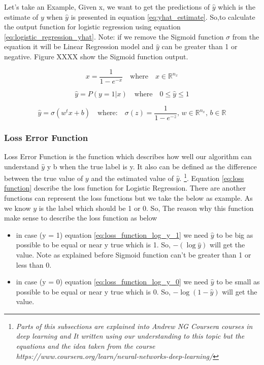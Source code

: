 Let's take an Example, Given x, we want to get the predictions of $\widehat{y}$ which is the estimate of $y$  when $\widehat{y}$  is presented in equation \eqref{eq:yhat_estimate}. So,to calculate the output function for logistic regression using equation \eqref{eq:logistic_regression_yhat}. Note: if we remove the Sigmoid function $\sigma$ from the equation it will be Linear Regression model and $\widehat{y}$ can be greater than 1 or negative. Figure XXXX show the Sigmoid function output. %

\begin{equation}\label{eq:logistic_function}
  x = \frac{1}{1-e^{-x}} \quad \text{where} \quad x \in \mathbb{R}^{n_x} 
\end{equation}

\begin{equation}
  \label{eq:yhat_estimate}
    \widehat{y} = P(y=1 | x) \quad \text{where}  \quad 0 \le \widehat{y}  \le 1
  \end{equation}

\begin{equation}
  \label{eq:logistic_regression_yhat}
  \widehat{y} = \sigma(w^t x + b)  \quad \text{where:} \quad  \sigma(z) = \frac{1}{1-e^{-z}} \text{, }  w \in  \mathbb{R}^{n_x} \text{, }  b \in  \mathbb{R}  
\end{equation}


\subsubsection{Loss Error Function}

Loss Error Function is the function which describes how well our algorithm can understand  $\widehat{y}$ y b when the true label is y. It also can be defined as the difference between the true value of $y$ and the estimated value of  $\widehat{y}$. \footnote{\textit{Parts of this subsections are explained into Andrew NG Coursera courses in deep learning and It written using our understanding to this topic but the equations and the idea taken from the course  https://www.coursera.org/learn/neural-networks-deep-learning/}}. Equation \eqref  {eq:loss function} describe the loss function for Logistic Regression. There are another functions can represent the loss functions but we take the below as example. As we know $y$ is the label which should be 1 or 0. So, The reason why this function make sense to describe the loss function as below
\begin{itemize}
\item in case (y = 1) equation \eqref{eq:loss_function_log_y_1} we need $\widehat{y}$ to be big as possible to be equal or near y true which is 1. So, $ - (\log \widehat{y} )$ will get the value. Note as explained before Sigmoid function can't be greater than 1 or less than 0. %
\item in case (y = 0) equation \eqref{eq:loss_function_log_y_0} we need $\widehat{y}$ to be small as possible to be equal or near y true which is 0. So, $- \log (1-\widehat{y})$  will get the value.  %
  \end{itemize}
  
